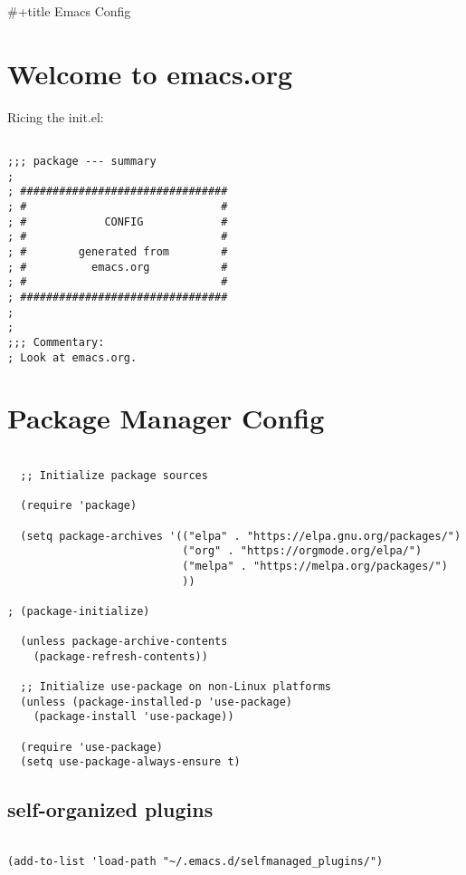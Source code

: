 \documentclass[11pt]{article}
\author{Paul Mayer}
\date{\today}
\title{}
\begin{document}
\tableofcontents

\#+title Emacs Config

\section{Welcome to emacs.org}
\label{sec:org92c0bd0}
Ricing the init.el:

\begin{verbatim}

;;; package --- summary
;
; ################################
; #                              #
; #            CONFIG            #
; #                              #
; #        generated from        #
; #          emacs.org           #
; #                              #
; ################################
;
;
;;; Commentary:
; Look at emacs.org.

\end{verbatim}

\section{Package Manager Config}
\label{sec:orgc94be82}
\begin{verbatim}

  ;; Initialize package sources

  (require 'package)

  (setq package-archives '(("elpa" . "https://elpa.gnu.org/packages/")
						   ("org" . "https://orgmode.org/elpa/")
						   ("melpa" . "https://melpa.org/packages/")
						   ))

; (package-initialize)

  (unless package-archive-contents
	(package-refresh-contents))

  ;; Initialize use-package on non-Linux platforms
  (unless (package-installed-p 'use-package)
	(package-install 'use-package))

  (require 'use-package)
  (setq use-package-always-ensure t)

\end{verbatim}

\subsection{self-organized plugins}
\label{sec:org930f938}

\begin{verbatim}

(add-to-list 'load-path "~/.emacs.d/selfmanaged_plugins/")

\end{verbatim}
\end{document}
